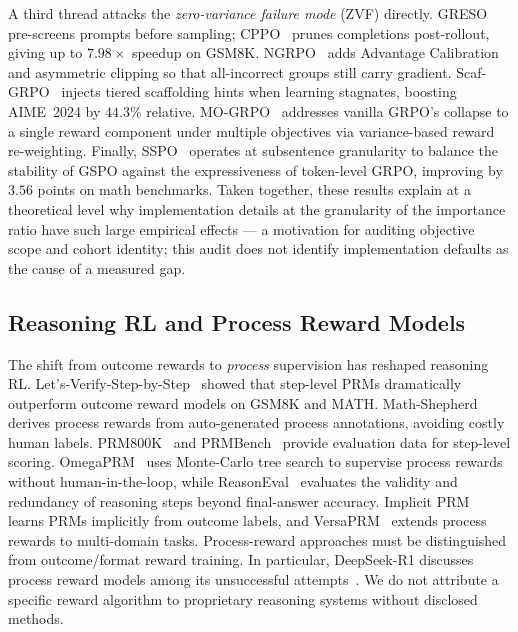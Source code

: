 A third thread attacks the \emph{zero-variance failure mode} (ZVF) directly.
GRESO~\cite{zhang2026greso} pre-screens prompts
before sampling; CPPO~\cite{lin2025cppo} prunes completions post-rollout,
giving up to $7.98\times$ speedup on GSM8K. NGRPO~\cite{nan2025ngrpo} adds
Advantage Calibration and asymmetric clipping so that all-incorrect groups
still carry gradient. Scaf-GRPO~\cite{zhang2025scaffgrpo} injects tiered
scaffolding hints when learning stagnates, boosting AIME~2024 by $44.3\%$
relative. MO-GRPO~\cite{ichihara2025mogrpo} addresses vanilla GRPO's
collapse to a single reward component under multiple objectives via
variance-based reward re-weighting. Finally,
SSPO~\cite{yang2025sspo} operates at subsentence granularity to balance the
stability of GSPO against the expressiveness of token-level GRPO, improving
by $3.56$ points on math benchmarks. Taken together, these results explain at
a theoretical level why implementation details at the granularity of the
importance ratio have such large empirical effects --- a motivation for auditing objective scope and cohort identity; this audit
does not identify implementation defaults as the cause of a measured gap.

\subsection{Reasoning RL and Process Reward Models}
\label{sec:related:reasoning}

The shift from outcome rewards to \emph{process} supervision has reshaped
reasoning RL. Let's-Verify-Step-by-Step~\cite{lightman2023prm} showed
that step-level PRMs dramatically outperform outcome reward models on GSM8K
and MATH. Math-Shepherd~\cite{wang2024mathshepherd} derives process rewards
from auto-generated process annotations, avoiding costly human labels.
PRM800K~\cite{lightman2023prm} and PRMBench~\cite{song2024prmbench} provide
evaluation data for step-level scoring. OmegaPRM~\cite{luo2024omegaprm} uses
Monte-Carlo tree search to supervise process rewards without human-in-the-loop,
while ReasonEval~\cite{xia2024reasoneval} evaluates the validity and
redundancy of reasoning steps beyond final-answer accuracy. Implicit PRM~\cite{yuan2024implicitprm} learns PRMs implicitly from
outcome labels, and VersaPRM~\cite{yuan2025versaprm} extends process rewards
to multi-domain tasks. Process-reward approaches must be distinguished from outcome/format reward
training. In particular, DeepSeek-R1 discusses process reward models among its
unsuccessful attempts~\cite{guo2025deepseekr1}. We do not attribute a specific
reward algorithm to proprietary reasoning systems without disclosed methods.

